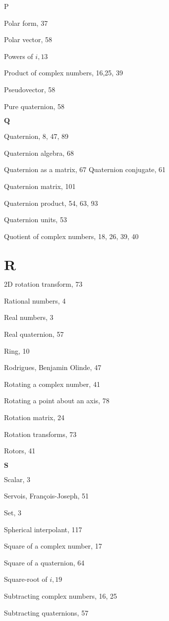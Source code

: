   P
  
  Polar form, 37
  
  Polar vector, 58
  
  Powers of $i, 13$
  
  Product of complex numbers, 16,25, 39
  
  Pseudovector, 58
  
  Pure quaternion, 58
  
  $\mathbf{Q}$
  
  Quaternion, 8, 47, 89
  
  Quaternion algebra, 68
  
  Quaternion as a matrix, 67 Quaternion conjugate, 61
  
  Quaternion matrix, 101
  
  Quaternion product, 54, 63, 93
  
  Quaternion units, 53
  
  Quotient of complex numbers, 18, 26, 39, 40
  
  \section{$\mathbf{R}$}
  2D rotation transform, 73
  
  Rational numbers, 4
  
  Real numbers, 3
  
  Real quaternion, 57
  
  Ring, 10
  
  Rodrigues, Benjamin Olinde, 47
  
  Rotating a complex number, 41
  
  Rotating a point about an axis, 78
  
  Rotation matrix, 24
  
  Rotation transforms, 73
  
  Rotors, 41
  
  $\mathbf{S}$
  
  Scalar, 3
  
  Servois, François-Joseph, 51
  
  Set, 3
  
  Spherical interpolant, 117
  
  Square of a complex number, 17
  
  Square of a quaternion, 64
  
  Square-root of $i, 19$
  
  Subtracting complex numbers, 16, 25
  
  Subtracting quaternions, 57
  
